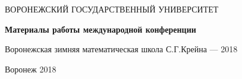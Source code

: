 \begin{titlepage}
   \begin{center}
   ВОРОНЕЖСКИЙ ГОСУДАРСТВЕННЫЙ УНИВЕРСИТЕТ
   \end{center}
\vspace{60mm}

    \begin{center}
      {\LARGE
      \bf

{\bf Материалы работы международной конференции}

 Воронежская зимняя математическая школа С.Г.Крейна --- 2018}

\vspace{10mm}


  \end{center}

 \begin{center}
   \vspace{90mm} Воронеж 2018
 \end{center}
\end{titlepage}
